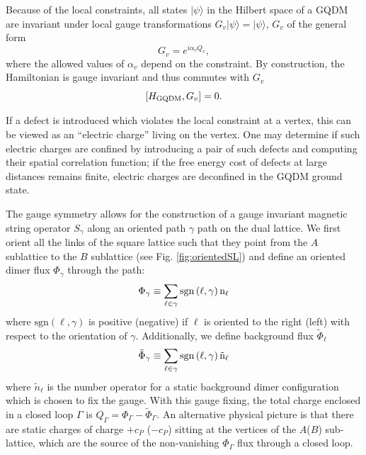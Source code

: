 \documentclass[twocolumn,prb,aps,floatfix,superscriptaddress]{revtex4-1}
\newcommand{\figref}[1]{Fig. \ref{#1}}
\newcommand{\ket}[1]{| #1 \rangle}
\begin{document}
Because of the local constraints, all states $\ket{\psi}$ in the Hilbert space of a GQDM are invariant under local gauge transformations $G_v \ket{\psi} = \ket{\psi}$, $G_v$ of the general form~\cite{Moessner2001}
\begin{equation}
G_v = e^{i \alpha_v Q_v}, \label{eq:Gv}
\end{equation}
where the allowed values of $\alpha_v$ depend on the constraint.  
By construction, the Hamiltonian is gauge invariant and thus commutes with $G_v$
\begin{equation}
\left[ H_{\rm{GQDM}}, G_v \right] = 0. \notag
\end{equation}

If a defect is introduced which violates the local constraint at a vertex, this can be viewed as an ``electric charge'' living on the vertex. One may determine if such electric charges are confined by introducing a pair of such defects and computing their spatial correlation function; if the free energy cost of defects at large distances remains finite, electric charges are deconfined in the GQDM ground state.

The gauge symmetry allows for the construction of a gauge invariant magnetic string operator $S_\gamma$ along an oriented path $\gamma$ path on the dual lattice. We first orient all the links of the square lattice such that they point from the $A$ sublattice to the $B$ sublattice (see \figref{fig:orientedSL}) and define an oriented dimer flux $\Phi_\gamma$ through the path:
\begin{equation}
\Phi_\gamma \equiv \sum_{\ell \in \gamma} \rm{sgn}\left(\ell,\gamma\right) n_\ell \label{eq:phi}
\end{equation}
where $\mathrm{sgn}(\ell,\gamma)$ is positive (negative) if $\ell$ is oriented to the right (left) with respect to the orientation of $\gamma$. Additionally, we define background flux $\tilde{\Phi}_\ell$
\begin{equation}
\tilde{\Phi}_\gamma \equiv  \sum_{\ell \in \gamma} \rm{sgn}\left(\ell,\gamma\right) \tilde{n}_\ell \label{eq:phiBackground}
\end{equation}
where $\tilde{n}_\ell$ is the number operator for a static background dimer configuration which is chosen to fix the gauge. With this gauge fixing, the total charge enclosed in a closed loop $\Gamma$ is $Q_\Gamma = \Phi_\Gamma- \tilde{\Phi}_\Gamma$. An alternative physical picture is that there are static charges of charge $+c_P$ ($-c_P$) sitting at the vertices of the $A$($B$) sub-lattice, which are the source of the non-vanishing $\Phi_\Gamma$ flux through a closed loop.
\end{document}

